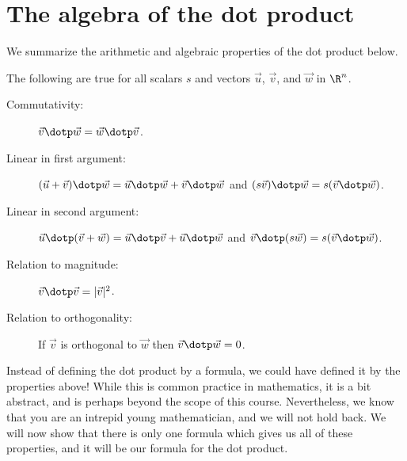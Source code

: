 \documentclass{ximera}
\begin{document}
\section{The algebra of the dot product}

We summarize the arithmetic and algebraic properties of the dot
product below.
\begin{theorem}
  The following are true for all scalars $s$ and vectors
  $\vec{u}$, $\vec{v}$, and $\vec{w}$ in $\R^n$.
  \begin{description}
  \item[Commutativity:] $\vec{v} \dotp \vec{w} = \vec{w} \dotp
    \vec{v}$.
  \item[Linear in first argument:] $(\vec{u}+\vec{v})\dotp \vec{w} = \vec{u}\dotp \vec{w} +
    \vec{v}\dotp \vec{w}$ and $(s\vec{v})\dotp \vec{w} = s(\vec{v}
    \dotp \vec{w})$.
  \item[Linear in second argument:] $\vec{u} \dotp (\vec{v}+\vec{w}) = \vec{u}\dotp \vec{v}+
    \vec{u}\dotp \vec{w}$ and $\vec{v} \dotp (s\vec{w}) = s(\vec{v}
    \dotp \vec{w})$.
  \item[Relation to magnitude:] $\vec{v} \dotp \vec{v} = |\vec{v}|^2$.
  \item[Relation to orthogonality:] If $\vec{v}$ is orthogonal to
    $\vec{w}$ then $\vec{v} \dotp \vec{w} = 0$.
  \end{description}
\end{theorem}

Instead of defining the dot product by a formula, we could have
defined it by the properties above!  While this is common practice in
mathematics, it is a bit abstract, and is perhaps beyond the scope of
this course. Nevertheless, we know that you are an intrepid young
mathematician, and we will not hold back.  We will now show that there
is only one formula which gives us all of these properties, and it
will be our formula for the dot product.
\end{document}
